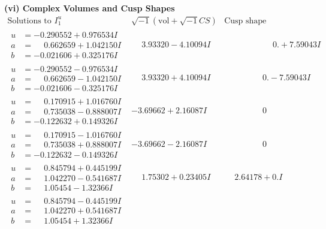 \documentclass[1p]{elsarticle_modified}
\theoremstyle{definition}
\newcommand{\I}{\sqrt{-1}}
\begin{document}
\newpage\flushleft \textbf{(vi) Complex Volumes and Cusp Shapes}
$$\begin{array}{c|c|c}  
\text{Solutions to }I^u_{1}& \I (\text{vol} + \sqrt{-1}CS) & \text{Cusp shape}\\
 \hline 
\begin{aligned}
u &= -0.290552 + 0.976534 I \\
a &= \phantom{-}0.662659 + 1.042150 I \\
b &= -0.021606 + 0.325176 I\end{aligned}
 & \phantom{-}3.93320 - 4.10094 I & \phantom{-0.000000 -}0. + 7.59043 I \\ \hline\begin{aligned}
u &= -0.290552 - 0.976534 I \\
a &= \phantom{-}0.662659 - 1.042150 I \\
b &= -0.021606 - 0.325176 I\end{aligned}
 & \phantom{-}3.93320 + 4.10094 I & \phantom{-0.000000 } 0. - 7.59043 I \\ \hline\begin{aligned}
u &= \phantom{-}0.170915 + 1.016760 I \\
a &= \phantom{-}0.735038 - 0.888007 I \\
b &= -0.122632 + 0.149326 I\end{aligned}
 & -3.69662 + 2.16087 I & \phantom{-0.000000 } 0 \\ \hline\begin{aligned}
u &= \phantom{-}0.170915 - 1.016760 I \\
a &= \phantom{-}0.735038 + 0.888007 I \\
b &= -0.122632 - 0.149326 I\end{aligned}
 & -3.69662 - 2.16087 I & \phantom{-0.000000 } 0 \\ \hline\begin{aligned}
u &= \phantom{-}0.845794 + 0.445199 I \\
a &= \phantom{-}1.042270 - 0.541687 I \\
b &= \phantom{-}1.05454 - 1.32366 I\end{aligned}
 & \phantom{-}1.75302 + 0.23405 I & \phantom{-}2.64178 + 0. I\phantom{ +0.000000I} \\ \hline\begin{aligned}
u &= \phantom{-}0.845794 - 0.445199 I \\
a &= \phantom{-}1.042270 + 0.541687 I \\
b &= \phantom{-}1.05454 + 1.32366 I\end{aligned}

\end{array}$$
\end{document}
